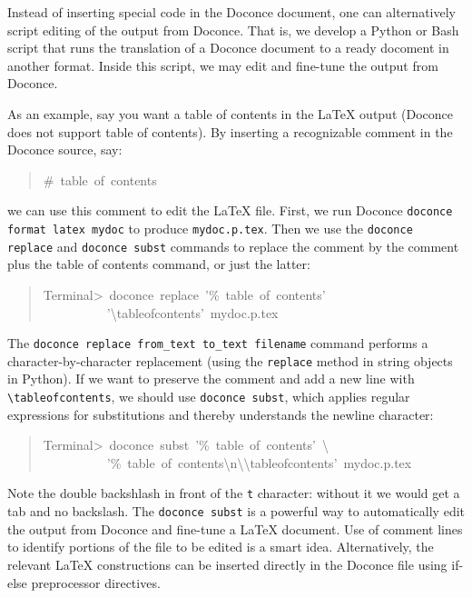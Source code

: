 \documentclass[a4paper]{article}
\begin{document}
Instead of inserting special code in the Doconce document, one can
alternatively script editing of the output from Doconce. That is,
we develop a Python or Bash script that runs the translation of
a Doconce document to a ready docoment in another format. Inside this
script, we may edit and fine-tune the output from Doconce.

As an example, say you want a table of contents in the LaTeX output
(Doconce does not support table of contents). By inserting a
recognizable comment in the Doconce source, say:
%
\begin{quote}{\ttfamily \raggedright \noindent
\#~table~of~contents
}
\end{quote}

we can use this comment to edit the LaTeX file. First, we run
Doconce \texttt{doconce format latex mydoc} to produce \texttt{mydoc.p.tex}. Then
we use the \texttt{doconce replace} and \texttt{doconce subst} commands to
replace the comment by the comment plus the table of contents command,
or just the latter:
%
\begin{quote}{\ttfamily \raggedright \noindent
Terminal>~doconce~replace~'\%~table~of~contents'\\
~~~~~~~~~~'\textbackslash{}tableofcontents'~mydoc.p.tex
}
\end{quote}

The \texttt{doconce replace from\_text to\_text filename} command performs a
character-by-character replacement (using the \texttt{replace} method in
string objects in Python). If we want to preserve the comment and add
a new line with \texttt{\textbackslash{}tableofcontents}, we should use \texttt{doconce subst},
which applies regular expressions for substitutions and thereby
understands the newline character:
%
\begin{quote}{\ttfamily \raggedright \noindent
Terminal>~doconce~subst~'\%~table~of~contents'~\textbackslash{}\\
~~~~~~~~~~'\%~table~of~contents\textbackslash{}n\textbackslash{}\textbackslash{}tableofcontents'~mydoc.p.tex
}
\end{quote}

Note the double backshlash in front of the \texttt{t} character: without it we
would get a tab and no backslash.
The \texttt{doconce subst} is a powerful way to automatically edit the output
from Doconce and fine-tune a LaTeX document. Use of comment lines to
identify portions of the file to be edited is a smart idea.
Alternatively, the relevant LaTeX constructions can be inserted directly
in the Doconce file using if-else preprocessor directives.
\end{document}
